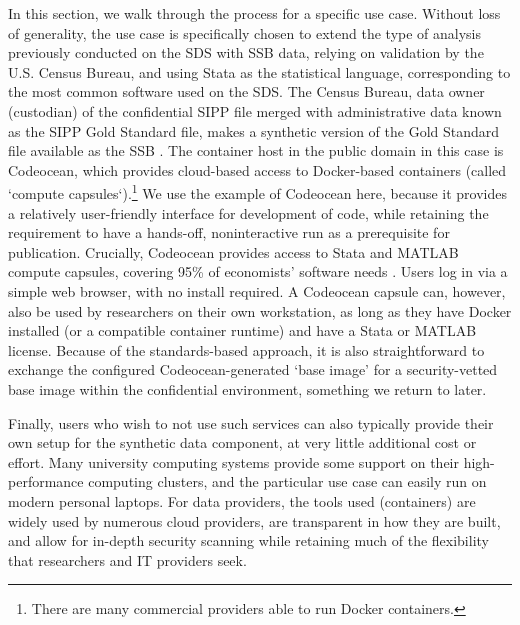 \documentclass[inline]{hdsr}
\begin{document}
In this section, we walk through the process for a specific use case. 
%
Without loss of generality, the use case is specifically chosen to extend the type of analysis previously conducted on the \ac{SDS} with \ac{SSB} data, relying on validation by the U.S. Census Bureau, and using Stata as the statistical language, corresponding to the most common software used on the \ac{SDS}. 
%
The Census Bureau, data owner (custodian) of the confidential SIPP file merged with administrative data known as the SIPP Gold Standard file, makes a synthetic version of the Gold Standard file available as the \ac{SSB} \citep{Benedettoetal_2013}. The container host in the public domain in this case is Codeocean, which provides cloud-based access to Docker-based containers (called `compute capsules`).\footnote{There are many commercial providers able to run Docker containers.} We use the example of Codeocean here, because it provides a relatively user-friendly interface for development of code, while retaining the requirement to have a hands-off, noninteractive run as a prerequisite for publication.  Crucially, Codeocean provides access to Stata and MATLAB compute capsules, covering 95\% of economists' software needs \citep{10.1257/pandp.110.764}. Users log in via a simple web browser, with no install required. A Codeocean capsule can, however, also be used by researchers on their own workstation, as long as they have Docker installed (or a compatible container runtime) and have a Stata or MATLAB license. Because of the standards-based approach, it is also straightforward to exchange the configured Codeocean-generated `base image' for a security-vetted base image within the confidential environment, something we return to later.

Finally, users who wish to not use such services can also typically provide their own setup for the synthetic data component, at very little additional cost or effort. Many university computing systems provide some support on their high-performance computing clusters, and the particular use case can easily run on modern personal laptops. For data providers, the tools used (containers) are widely used by numerous cloud providers, are transparent in how they are built, and allow for in-depth security scanning while retaining much of the flexibility that researchers and IT providers seek.
\end{document}

